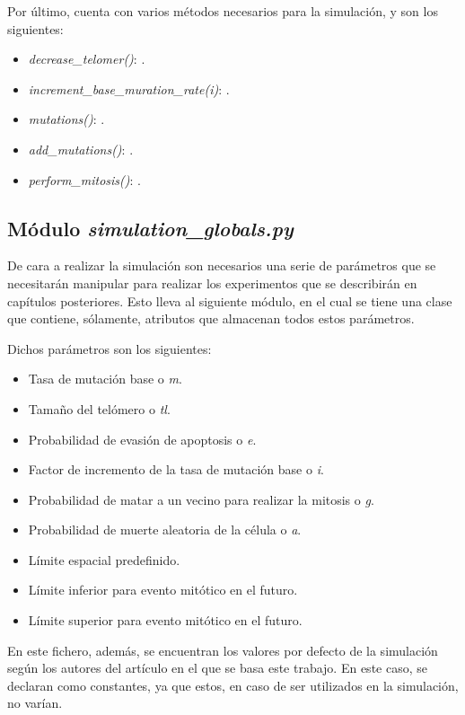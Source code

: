 Por último, cuenta con varios métodos necesarios para la simulación, y son los siguientes:

\begin{itemize}
    \item \textit{decrease\_telomer()}: .
    \item \textit{increment\_base\_muration\_rate(i)}: .
    \item \textit{mutations()}: .
    \item \textit{add\_mutations()}: .
    \item \textit{perform\_mitosis()}: .
\end{itemize}

\subsection{Módulo \textit{simulation\_globals.py}}

De cara a realizar la simulación son necesarios una serie de parámetros que se necesitarán manipular
para realizar los experimentos que se describirán en capítulos posteriores. Esto lleva al siguiente módulo,
en el cual se tiene una clase que contiene, sólamente, atributos que almacenan todos estos parámetros.

Dichos parámetros son los siguientes:

\begin{itemize}
    \item Tasa de mutación base o \textit{m}.
    \item Tamaño del telómero o \textit{tl}.
    \item Probabilidad de evasión de apoptosis o \textit{e}.
    \item Factor de incremento de la tasa de mutación base o \textit{i}.
    \item Probabilidad de matar a un vecino para realizar la mitosis o \textit{g}.
    \item Probabilidad de muerte aleatoria de la célula o \textit{a}.
    \item Límite espacial predefinido.
    \item Límite inferior para evento mitótico en el futuro.
    \item Límite superior para evento mitótico en el futuro.
\end{itemize}

En este fichero, además, se encuentran los valores por defecto de la simulación según los autores
del artículo \cite{jsantos-amonteagudo-1-2014} en el que se basa este trabajo. En este caso,
se declaran como constantes, ya que estos, en caso de ser utilizados en la simulación, no varían.

